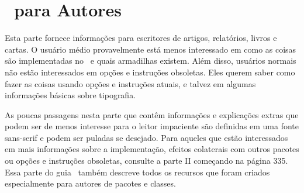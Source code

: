 \chapter{\KOMAScript\ para Autores}
Esta parte fornece informações para escritores de artigos, relatórios, livros e cartas. O usuário médio provavelmente está menos interessado em como as coisas são implementadas no \KOMAScript\ e quais armadilhas existem. Além disso, usuários normais não estão interessados em opções e instruções obsoletas. Eles querem saber como fazer as coisas usando opções e instruções atuais, e talvez em algumas informações básicas sobre tipografia.

As poucas passagens nesta parte que contêm informações e explicações extras que podem ser de menos interesse para o leitor impaciente são definidas em uma fonte sans-serif e podem ser puladas se desejado. Para aqueles que estão interessados em mais informações sobre a implementação, efeitos colaterais com outros pacotes ou opções e instruções obsoletas, consulte a parte II começando na página 335. Essa parte do guia \KOMAScript\ também descreve todos os recursos que foram criados especialmente para autores de pacotes e classes.